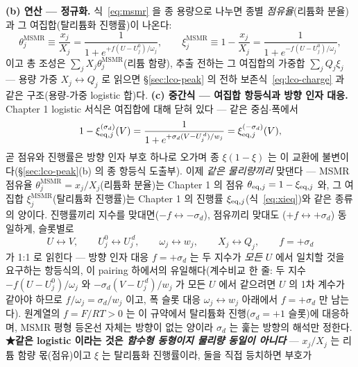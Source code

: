 \textbf{(b) 연산 --- 정규화.} 식~\eqref{eq:msmr} 을 종 용량으로 나누면
종별 \emph{점유율}(리튬화 분율)과 그 여집합(탈리튬화 진행률)이 나온다:
\begin{equation}
\theta_j^{\mathrm{MSMR}}\equiv\frac{x_j}{X_j}=\frac{1}{1+e^{+f(U-U_j^0)/\omega_j}},\qquad
\xi_j^{\mathrm{MSMR}}\equiv1-\frac{x_j}{X_j}=\frac{1}{1+e^{-f(U-U_j^0)/\omega_j}},
\label{eq:lco-msmrnorm}
\end{equation}
이고 총 조성은 $\sum_jX_j\theta_j^{\mathrm{MSMR}}$(리튬 함량), 추출 전하는 그 여집합의 가중합
$\sum_jQ_j\xi_j$ --- 용량 가중 $X_j\!\leftrightarrow\!Q_j$ 로 읽으면 \S\ref{sec:lco-peak} 의 전하
보존식~\eqref{eq:lco-charge} 과 같은 구조(용량-가중 logistic 합)다.
\textbf{(c) 중간식 --- 여집합 항등식과 방향 인자 대응.} Chapter 1 logistic 서식은 여집합에 대해 닫혀 있다 ---
같은 중심$\cdot$폭에서
\begin{equation}
1-\xi_{\mathrm{eq},j}^{(\sigma_d)}(V)
=\frac{1}{1+e^{+\sigma_d(V-U_j^{\,d})/w_j}}
=\xi_{\mathrm{eq},j}^{(-\sigma_d)}(V),
\label{eq:lco-comp}
\end{equation}
곧 점유와 진행률은 방향 인자 부호 하나로 오가며 종 $\xi(1-\xi)$ 는 이 교환에 불변이다(\S\ref{sec:lco-peak}(b) 의 종 항등식 도출부). 이제 \emph{같은 물리량끼리} 맞댄다 --- MSMR 점유율
$\theta_j^{\mathrm{MSMR}}=x_j/X_j$(리튬화 분율)는 Chapter 1 의 점유 $\theta_{\mathrm{eq},j}=1-\xi_{\mathrm{eq},j}$ 와, 그 여집합
$\xi_j^{\mathrm{MSMR}}$(탈리튬화 진행률)는 Chapter 1 의 진행률 $\xi_{\mathrm{eq},j}$(식~\eqref{eq:xieq})와 같은 종류의
양이다. 진행률끼리 지수를 맞대면($-f\leftrightarrow-\sigma_d$), 점유끼리 맞대도
($+f\leftrightarrow+\sigma_d$) 동일하게, 슬롯별로
\begin{equation}
U\leftrightarrow V,\qquad U_j^0\leftrightarrow U_j^{\,d},\qquad
\omega_j\leftrightarrow w_j,\qquad X_j\leftrightarrow Q_j,\qquad
f=+\sigma_d
\label{eq:lco-msmrmap}
\end{equation}
가 1:1 로 읽힌다 --- 방향 인자 대응 $f=+\sigma_d$ 는 두 지수가 \emph{모든} $U$ 에서 일치할 것을 요구하는
항등식의, 이 pairing 하에서의 유일해다(계수비교 한 줄: 두 지수 $-f(U-U_j^0)/\omega_j$ 와
$-\sigma_d(V-U_j^{\,d})/w_j$ 가 모든 $U$ 에서 같으려면 $U$ 의 1차 계수가 같아야 하므로
$f/\omega_j=\sigma_d/w_j$ 이고, 폭 슬롯 대응 $\omega_j\leftrightarrow w_j$ 아래에서 $f=+\sigma_d$ 만 남는다). 원계열의 $f=F/RT>0$ 는 이 규약에서 탈리튬화 진행($\sigma_d=+1$ 슬롯)에 대응하며,
MSMR 평형 등온선 자체는 방향이 없는 양이라 $\sigma_d$ 는 훑는 방향의 해석만 정한다. \textbf{★같은 logistic 이라는 것은 \emph{함수형 동형이지 물리량 동일이
아니다}} --- $x_j/X_j$ 는 리튬 함량 몫(점유)이고 $\xi$ 는 탈리튬화 진행률이라, 둘을 직접 등치하면 부호가
